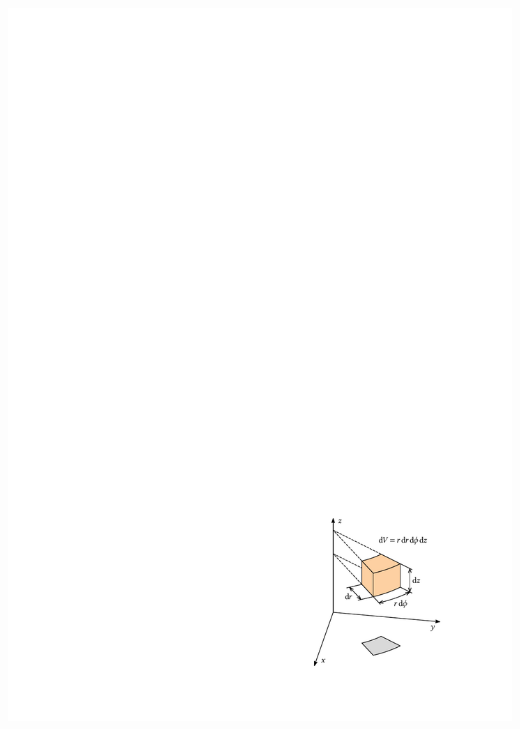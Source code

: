 \documentclass[11pt,a4paper]{article}
\begin{document}
\begin{center}
\includegraphics[scale=1]{pdf/examples/diff_element_cyl_coord_1.pdf}
\end{center}
\end{document}
